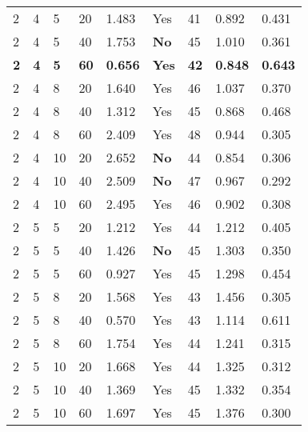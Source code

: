 \begin{longtable}{x{1.5cm} x{1.8cm} x{1.8cm} x{1.5cm} x{1.8cm} x{1.5cm} x{1.5cm} x{1.5cm} x{1.8cm}}
	2 & 4 & 5 & 20 & 1.483 & Yes & 41 & 0.892 & 0.431 \\
	2 & 4 & 5 & 40 & 1.753 & \textbf{No} & 45 & 1.010 & 0.361 \\
	\textbf{2} & \textbf{4} & \textbf{5} & \textbf{60} & \textbf{0.656} & \textbf{Yes} & \textbf{42} & \textbf{0.848} & \textbf{0.643} \\
	2 & 4 & 8 & 20 & 1.640 & Yes & 46 & 1.037 & 0.370 \\
	2 & 4 & 8 & 40 & 1.312 & Yes & 45 & 0.868 & 0.468 \\
	2 & 4 & 8 & 60 & 2.409 & Yes & 48 & 0.944 & 0.305 \\
	2 & 4 & 10 & 20 & 2.652 & \textbf{No} & 44 & 0.854 & 0.306 \\
	2 & 4 & 10 & 40 & 2.509 & \textbf{No} & 47 & 0.967 & 0.292 \\
	2 & 4 & 10 & 60 & 2.495 & Yes & 46 & 0.902 & 0.308 \\
	2 & 5 & 5 & 20 & 1.212 & Yes & 44 & 1.212 & 0.405 \\
	2 & 5 & 5 & 40 & 1.426 & \textbf{No} & 45 & 1.303 & 0.350 \\
	2 & 5 & 5 & 60 & 0.927 & Yes & 45 & 1.298 & 0.454 \\
	2 & 5 & 8 & 20 & 1.568 & Yes & 43 & 1.456 & 0.305 \\
	2 & 5 & 8 & 40 & 0.570 & Yes & 43 & 1.114 & 0.611 \\
	2 & 5 & 8 & 60 & 1.754 & Yes & 44 & 1.241 & 0.315 \\
	2 & 5 & 10 & 20 & 1.668 & Yes & 44 & 1.325 & 0.312 \\
	2 & 5 & 10 & 40 & 1.369 & Yes & 45 & 1.332 & 0.354 \\
	2 & 5 & 10 & 60 & 1.697 & Yes & 45 & 1.376 & 0.300 \\
	

\end{longtable}
